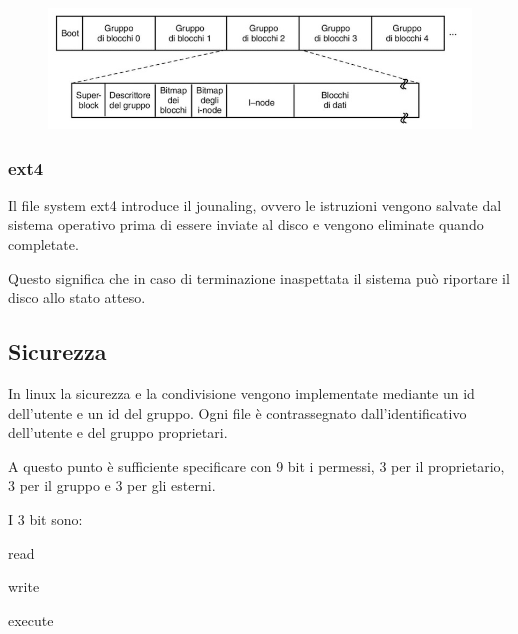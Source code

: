\begin{figure}[H]
    \centering
    \includegraphics[width=0.5\linewidth]{assets/linux-ext2.jpeg}
\end{figure}

\subsubsection{ext4}
Il file system ext4 introduce il jounaling, ovvero le istruzioni vengono salvate dal sistema operativo prima di essere inviate al disco e vengono eliminate quando completate.

Questo significa che in caso di terminazione inaspettata il sistema può riportare il disco allo stato atteso.

\subsection{Sicurezza}
In linux la sicurezza e la condivisione vengono implementate mediante un id dell'utente e un id del gruppo.
Ogni file è contrassegnato dall'identificativo dell'utente e del gruppo proprietari.

\spacer
A questo punto è sufficiente specificare con 9 bit i permessi, 3 per il proprietario, 3 per il gruppo e 3 per gli esterni.

I 3 bit sono:
\begin{sitemize}
    \item read
    \item write
    \item execute
\end{sitemize}
